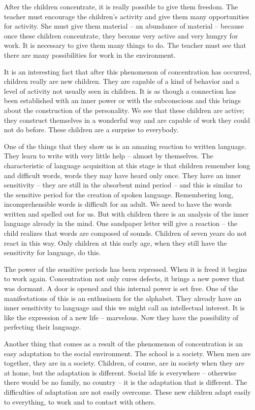 \documentclass[lang=cn,10pt]{elegantbook}
\begin{document}
After the children concentrate, it is really possible to give them freedom. The teacher must encourage the children's activity and give them many opportunities for activity. She must give them material – an abundance of material – because once these children concentrate, they become very active and very hungry for work. It is necessary to give them many things to do. The teacher must see that there are many possibilities for work in the environment.

It is an interesting fact that after this phenomenon of concentration has occurred, children really are new children. They are capable of a kind of behavior and a level of activity not usually seen in children. It is as though a connection has been established with an inner power or with the subconscious and this brings about the construction of the personality. We see that these children are active; they construct themselves in a wonderful way and are capable of work they could not do before. These children are a surprise to everybody.

One of the things that they show us is an amazing reaction to written language. They learn to write with very little help – almost by themselves. The characteristic of language acquisition at this stage is that children remember long and difficult words, words they may have heard only once. They have an inner sensitivity – they are still in the absorbent mind period – and this is similar to the sensitive period for the creation of spoken language. Remembering long, incomprehensible words is difficult for an adult. We need to have the
words written and spelled out for us. But with children there is an analysis of the inner language already in the mind. One sandpaper letter will give a reaction – the child realizes that words are composed of sounds. Children of seven years do not react in this way. Only children at this early age, when they still have the sensitivity for language, do this.

The power of the sensitive periods has been repressed. When it is freed it begins to work again. Concentration not only cures defects, it brings a new power that was dormant. A door is opened and this internal power is set free. One of the manifestations of this is an enthusiasm for the alphabet. They already have an inner sensitivity to language and this we might call an intellectual interest. It is like the expression of a new life – marvelous. Now they have the possibility of perfecting their language.

Another thing that comes as a result of the phenomenon of concentration is an easy adaptation to the social environment. The school is a society. When men are together, they are in a society. Children, of course, are in society when they are at home, but the adaptation is different. Social life is everywhere – otherwise there would be no family, no country – it is the adaptation that is different. The difficulties of adaptation are not easily overcome. These new children adapt easily to everything, to work and to contact with others.
\end{document}
